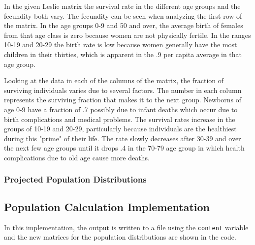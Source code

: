 \documentclass[letterpaper,12pt]{article}
\begin{document}
In the given Leslie matrix the survival rate in the different age groups and the
fecundity both vary.
The fecundity can be seen when analyzing the first row of the matrix.
In the age groups 0-9 and 50 and over, the average birth of females from that
age class is zero because women are not physically fertile.
In the ranges 10-19 and 20-29 the birth rate is low because women generally have
the most children in their thirties, which is apparent in the .9 per capita
average in that age group. 

Looking at the data in each of the columns of the matrix, the fraction of
surviving individuals varies due to several factors.
The number in each column represents the surviving fraction that makes it to the
next group.
Newborns of age 0-9 have a fraction of .7 possibly due to infant deaths which
occur due to birth complications and medical problems.
The survival rates increase in the groups of 10-19 and 20-29, particularly
because individuals are the healthiest during this "prime" of their life.
The rate slowly decreases after 30-39 and over the next few age groups until it
drops .4 in the 70-79 age group in which health complications due to old age
cause more deaths.

\subsubsection{Projected Population Distributions}

\subsection{Population Calculation Implementation}
In this implementation, the output is written to a file using the
\texttt{content} variable and the new matrices for the population distributions
are shown in the code.
\end{document}
